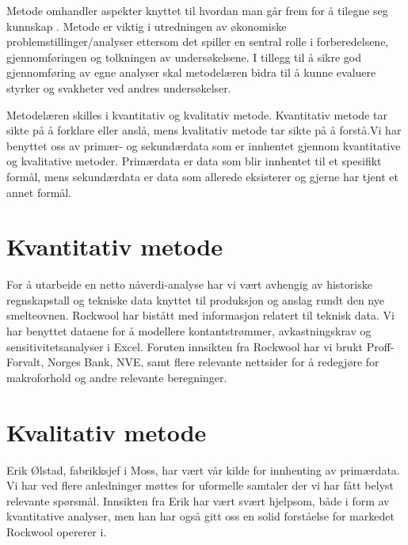 Metode omhandler aspekter knyttet til hvordan man går frem for å tilegne seg kunnskap \cite{genaro}. Metode er viktig i utredningen av økonomiske problemstillinger/analyser ettersom det spiller en sentral rolle i forberedelsene, gjennomføringen og tolkningen av undersøkelsene. I tillegg til å sikre god gjennomføring av egne analyser skal metodelæren bidra til å kunne evaluere styrker og svakheter ved andres undersøkelser. 

\indent \newline
Metodelæren skilles i kvantitativ og kvalitativ metode. Kvantitativ metode tar sikte på å forklare eller anslå, mens kvalitativ metode tar sikte på å forstå.Vi har benyttet oss av primær- og sekundærdata som er innhentet gjennom kvantitative og kvalitative metoder. Primærdata er data som blir innhentet til et spesifikt formål, mens sekundærdata er data som allerede eksisterer og gjerne har tjent et annet formål.
 
\section{Kvantitativ metode}
For å utarbeide en netto nåverdi-analyse har vi vært avhengig av historiske regnskapstall og tekniske data knyttet til produksjon og anslag rundt den nye smelteovnen. Rockwool har bistått med informasjon relatert til teknisk data. Vi har benyttet dataene for å modellere kontantstrømmer, avkastningskrav og sensitivitetsanalyser i Excel. Foruten innsikten fra Rockwool har vi brukt Proff-Forvalt, Norges Bank, NVE, samt flere relevante nettsider for å redegjøre for makroforhold og andre relevante beregninger.
 
\section{Kvalitativ metode}
Erik Ølstad, fabrikksjef i Moss, har vært vår kilde for innhenting av primærdata. Vi har ved flere anledninger møttes for uformelle samtaler der vi har fått belyst relevante spørsmål. Innsikten fra Erik har vært svært hjelpsom, både i form av kvantitative analyser, men han har også gitt oss en solid forståelse for markedet Rockwool opererer i.
